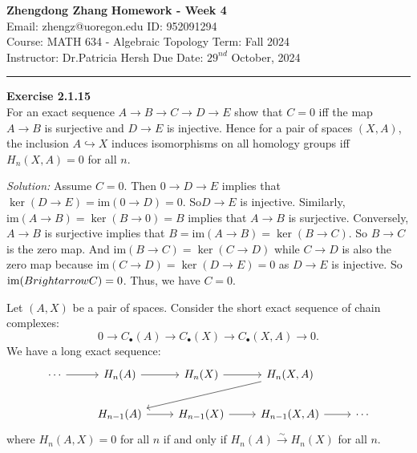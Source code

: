 \documentclass[a4paper, 11pt]{article}
\newenvironment{problem}[2][Exercise]
    { \begin{mdframed}[backgroundcolor=gray!20] \textbf{#1 #2} \\}
    {  \end{mdframed}}
\newenvironment{solution}
    {\textit{Solution:}}
    {}
\begin{document}
\noindent
\large\textbf{Zhengdong Zhang} \hfill \textbf{Homework - Week 4}   \\
Email: zhengz@uoregon.edu \hfill ID: 952091294 \\
\normalsize Course: MATH 634 - Algebraic Topology  \hfill Term: Fall 2024\\
Instructor: Dr.Patricia Hersh \hfill Due Date: $29^{nd}$ October, 2024 \\
\noindent\rule{7in}{2.8pt}
\begin{problem}{2.1.15}
For an exact sequence \(A\rightarrow B\rightarrow C\rightarrow D\rightarrow E\) show that \(C=0\) iff the map \(A\rightarrow B\) is surjective and 
\(D\rightarrow E\) is injective. Hence for a pair of spaces \((X,A)\), the inclusion \(A\hookrightarrow X\) induces isomorphisms on all homology groups iff 
\(H_n(X,A)=0\) for all \(n\).
\end{problem}   
\begin{solution}
Assume \(C=0\). Then \(0\rightarrow D\rightarrow E\) implies that \(\ker (D\rightarrow E)=\text{im}(0\rightarrow D)=0\). So\(D\rightarrow E\) is injective. Similarly, 
\(\text{im}(A\rightarrow B)=\ker (B\rightarrow 0)=B\) implies  that \(A\rightarrow B\) is surjective. Conversely, \(A\rightarrow B\) is surjective implies that \(B=\text{im}(A\rightarrow B)=\ker (B\rightarrow C)\). 
So \(B\rightarrow C\) is the zero map. And \(\text{im}(B\rightarrow C)=\ker (C\rightarrow D)\) while \(C\rightarrow D\) is also the zero map because \(\text{im}(C\rightarrow D)=\ker (D\rightarrow E)=0\) as \(D\rightarrow E\) 
is injective. So \(\text{im}(B\\rightarrow C)=0\). Thus, we have \(C=0\). 
\par 
Let \((A,X)\) be a pair of spaces. Consider the short exact sequence of chain complexes:
$$0\rightarrow C_\bullet(A)\rightarrow C_\bullet(X)\rightarrow C_\bullet(X,A)\rightarrow 0.$$
We have a long exact sequence:
$$\begin{tikzcd}
	\cdots & {H_n(A)} & {H_n(X)} & {H_n(X,A)} \\
	& {H_{n-1}(A)} & {H_{n-1}(X)} & {H_{n-1}(X,A)} & \cdots
	\arrow[from=1-1, to=1-2]
	\arrow[from=1-2, to=1-3]
	\arrow[from=1-3, to=1-4]
	\arrow[from=1-4, to=2-2]
	\arrow[from=2-2, to=2-3]
	\arrow[from=2-3, to=2-4]
	\arrow[from=2-4, to=2-5]
\end{tikzcd}$$
where \(H_n(A,X)=0\) for all \(n\) if and only if \(H_n(A)\xrightarrow{\sim} H_n(X)\) for all \(n\).
\end{solution}
\end{document}

